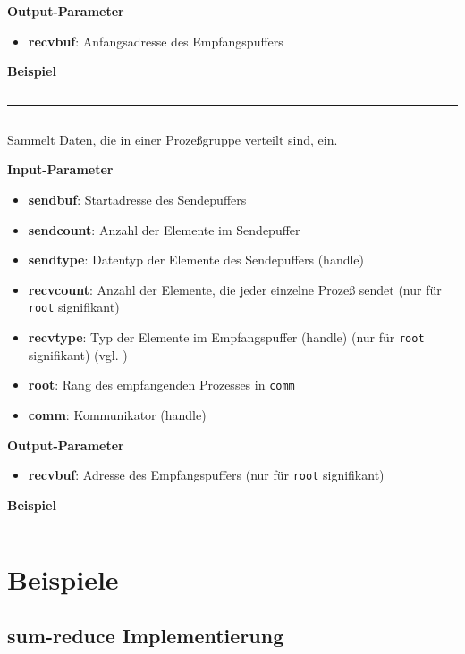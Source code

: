 \textbf{Output-Parameter}
\begin{itemize}
    \item \textbf{recvbuf}: Anfangsadresse des Empfangspuffers
\end{itemize}

\textbf{Beispiel}
\inputminted[numbersep=5pt, tabsize=4]{c}{scripts/mpi/mpi-allgather-example.c}
\goodbreak
\rule{\textwidth}{0.4pt}%
\inputminted[numbersep=5pt, tabsize=4]{c}{scripts/mpi/mpi-gather.c}
Sammelt Daten, die in einer Prozeßgruppe verteilt sind, ein.

\textbf{Input-Parameter}
\begin{itemize}
    \item \textbf{sendbuf}: Startadresse des Sendepuffers
    \item \textbf{sendcount}: Anzahl der Elemente im Sendepuffer
    \item \textbf{sendtype}: Datentyp der Elemente des Sendepuffers (handle)
    \item \textbf{recvcount}: Anzahl der Elemente, die jeder einzelne Prozeß sendet (nur für \texttt{root} signifikant)
    \item \textbf{recvtype}: Typ der Elemente im Empfangspuffer (handle) (nur für \texttt{root} signifikant) (vgl. )
    \item \textbf{root}: Rang des empfangenden Prozesses in \texttt{comm}
    \item \textbf{comm}: Kommunikator (handle)
\end{itemize}

\textbf{Output-Parameter}
\begin{itemize}
    \item \textbf{recvbuf}: Adresse des Empfangspuffers (nur für \texttt{root} signifikant)
\end{itemize}

\textbf{Beispiel}
\inputminted[numbersep=5pt, tabsize=4]{c}{scripts/mpi/mpi-reduce-example.c}

\section{Beispiele}
\subsection{sum-reduce Implementierung}%
\inputminted[numbersep=5pt, tabsize=4]{c}{scripts/mpi/mpi-sum-reduce.c}

